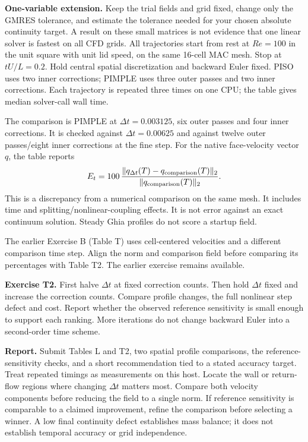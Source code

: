 \textbf{One-variable extension.} Keep the trial fields and grid fixed, change
only the GMRES tolerance, and estimate the tolerance needed for your chosen
absolute continuity target. A result on these small matrices is not evidence
that one linear solver is fastest on all CFD grids.
\newpage
{}
All trajectories start from rest at $Re=100$ in the unit square with unit lid
speed, on the same 16-cell MAC mesh. Stop at $tU/L=0.2$. Hold central spatial
discretization and backward Euler fixed. PISO uses two inner corrections;
PIMPLE uses three outer passes and two inner corrections. Each trajectory is
repeated three times on one CPU; the table gives median solver-call wall time.

The comparison is PIMPLE at $\Delta t=0.003125$, six outer passes and four inner
corrections. It is checked against $\Delta t=0.00625$ and against twelve outer
passes/eight inner corrections at the fine step. For the native face-velocity
vector $q$, the table reports
\[
 E_t=100\,\frac{\|q_{\Delta t}(T)-q_{\rm comparison}(T)\|_2}
                         {\|q_{\rm comparison}(T)\|_2}.
\]
This is a discrepancy from a numerical comparison on the same mesh. It includes
time and splitting/nonlinear-coupling effects. It is not error against an exact
continuum solution. Steady Ghia profiles do not score a startup field.

The earlier Exercise B (Table T) uses cell-centered velocities and a different
comparison time step. Align the norm and comparison field before comparing
its percentages with Table T2. The earlier exercise remains available.

\textbf{Exercise T2.} First halve $\Delta t$ at fixed correction counts. Then
hold $\Delta t$ fixed and increase the correction counts. Compare profile
changes, the full nonlinear step defect and cost. Report whether the observed
reference sensitivity is small enough to support each ranking. More iterations
do not change backward Euler into a second-order time scheme.

\textbf{Report.} Submit Tables L and T2, two spatial profile comparisons,
the reference-sensitivity checks, and a short recommendation tied to a stated
accuracy target. Treat repeated timings as measurements on this host.
\newpage
{}
Locate the wall or return-flow regions where changing $\Delta t$ matters most.
Compare both velocity components before reducing the field to a single norm.
If reference sensitivity is comparable to a claimed improvement, refine the
comparison before selecting a winner. A low final continuity defect establishes
mass balance; it does not establish temporal accuracy or grid independence.
